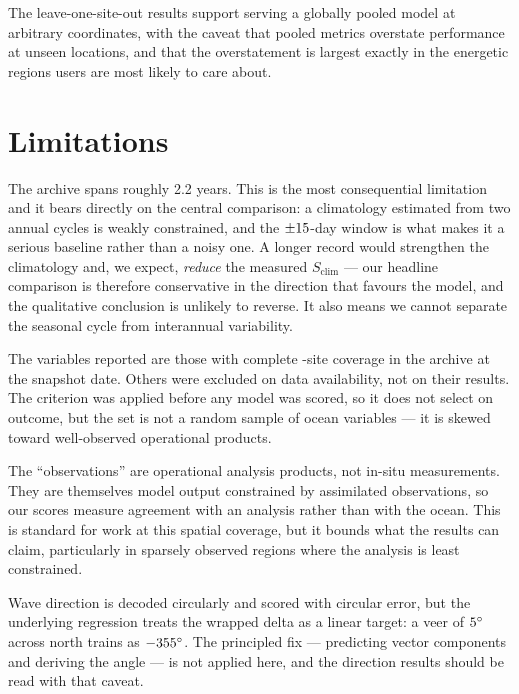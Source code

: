 The leave-one-site-out results support serving a globally pooled model at
arbitrary coordinates, with the caveat that pooled metrics overstate
performance at unseen locations, and that the overstatement is largest exactly
in the energetic regions users are most likely to care about.

\section{Limitations}
\label{sec:limitations}

The archive spans roughly 2.2 years. This is the most consequential limitation
and it bears directly on the central comparison: a climatology estimated from
two annual cycles is weakly constrained, and the $\pm15$-day window is
what makes it a serious baseline rather than a noisy one. A longer record would
strengthen the climatology and, we expect, \emph{reduce} the measured
$S_{\mathrm{clim}}$ --- our headline comparison is therefore conservative in
the direction that favours the model, and the qualitative conclusion is
unlikely to reverse. It also means we cannot separate the seasonal cycle from
interannual variability.

The \NVars{} variables reported are those with complete \NSites{}-site coverage
in the archive at the snapshot date. Others were excluded on data availability,
not on their results. The criterion was applied before any model was scored, so
it does not select on outcome, but the set is not a random sample of ocean
variables --- it is skewed toward well-observed operational products.

The ``observations'' are operational analysis products, not in-situ
measurements. They are themselves model output constrained by assimilated
observations, so our scores measure agreement with an analysis rather than with
the ocean. This is standard for work at this spatial coverage, but it bounds
what the results can claim, particularly in sparsely observed regions where the
analysis is least constrained.

Wave direction is decoded circularly and scored with circular error, but the
underlying regression treats the wrapped delta as a linear target: a veer of
$5^{\circ}$ across north trains as $-355^{\circ}$. The principled fix ---
predicting vector components and deriving the angle --- is not applied here,
and the direction results should be read with that caveat.

